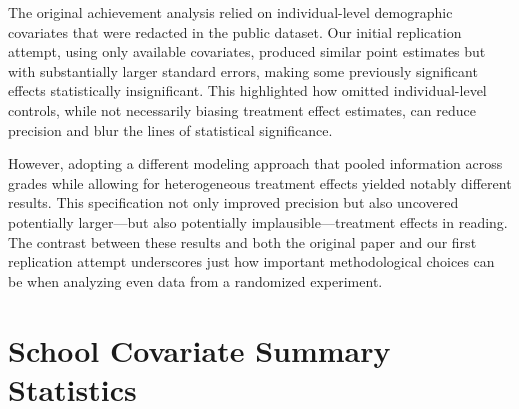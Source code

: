 \documentclass[11pt]{article}
\begin{document}
The original achievement analysis relied on individual-level demographic
covariates that were redacted in the public dataset. Our initial replication
attempt, using only available covariates, produced similar point estimates but
with substantially larger standard errors, making some previously significant
effects statistically insignificant. This highlighted how omitted
individual-level controls, while not necessarily biasing treatment effect
estimates, can reduce precision and blur the lines of statistical significance.

However, adopting a different modeling approach that pooled information
across grades while allowing for heterogeneous treatment effects yielded
notably different results. This specification not only improved precision but
also uncovered potentially larger—but also potentially implausible—treatment
effects in reading. The contrast between these results and both the original paper and our first
replication attempt underscores just how important methodological choices can be when
analyzing even data from a randomized experiment.

\clearpage

\printbibliography

\newpage

\appendix

\section{School Covariate Summary Statistics}


\end{document}
